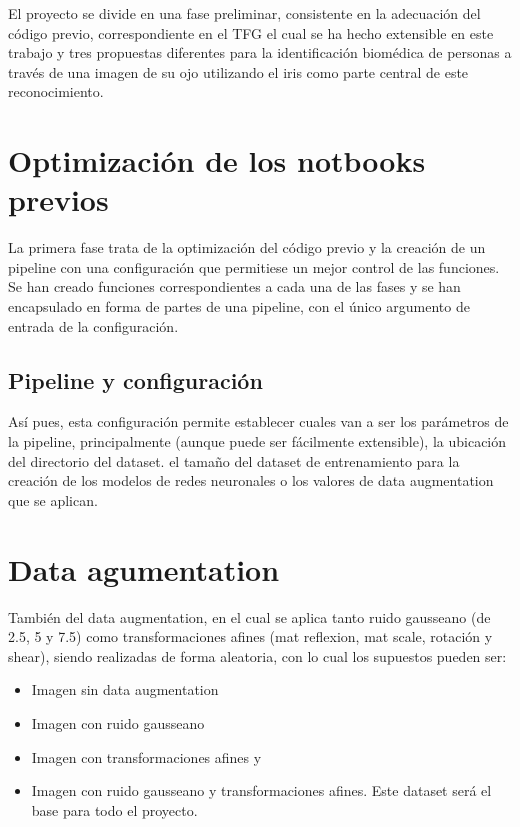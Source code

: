 
El proyecto se divide en una fase preliminar, consistente en la adecuación del código previo, correspondiente en el TFG
el cual se ha hecho extensible en este trabajo y tres propuestas diferentes para la identificación biomédica de personas 
a través de una imagen de su ojo utilizando el iris como parte central de este reconocimiento.

\section{Optimización de los notbooks previos}

La primera fase trata de la optimización del código previo y la creación de un pipeline con una configuración que permitiese un mejor control de las funciones.
Se han creado funciones correspondientes a cada una de las fases y se han encapsulado en forma de partes de una pipeline, con el único argumento de entrada de la 
configuración. 


\subsection{Pipeline y configuración} 

Así pues, esta configuración permite establecer cuales van a ser los parámetros de la pipeline, principalmente (aunque puede ser fácilmente extensible),
 la ubicación del directorio del dataset. el tamaño del dataset de entrenamiento para la creación de los modelos de redes neuronales o los valores
 de data augmentation que se aplican.

\section{Data agumentation}

También del  data augmentation, en el cual se aplica tanto ruido gausseano (de 2.5, 5 y 7.5) como transformaciones afines (mat reflexion, mat scale, rotación y shear), siendo realizadas de 
forma aleatoria, con lo cual los supuestos pueden ser:

\begin{itemize}
    \item Imagen sin data augmentation
    \item Imagen con ruido gausseano
    \item Imagen con transformaciones afines y 
    \item Imagen con ruido gausseano y transformaciones afines. Este dataset será el base para todo el proyecto.
\end{itemize}


